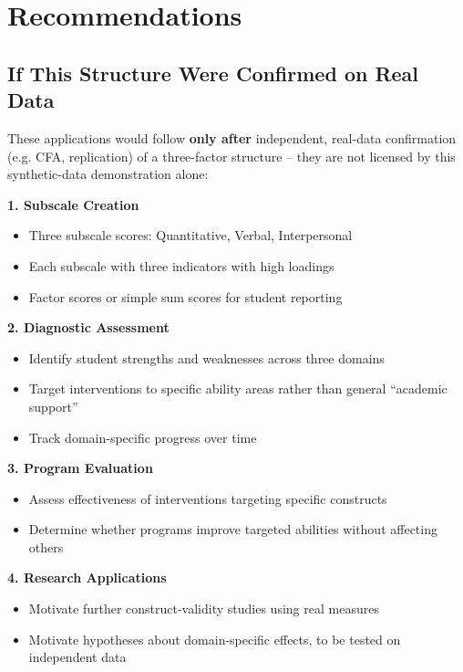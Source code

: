 \documentclass[
]{article}
\begin{document}
\section{Recommendations}

\subsection{If This Structure Were Confirmed on Real Data}

These applications would follow \textbf{only after} independent,
real-data confirmation (e.g. CFA, replication) of a three-factor
structure -- they are not licensed by this synthetic-data demonstration
alone:

\textbf{1. Subscale Creation}

\begin{itemize}
\item
  Three subscale scores: Quantitative, Verbal, Interpersonal
\item
  Each subscale with three indicators with high loadings
\item
  Factor scores or simple sum scores for student reporting
\end{itemize}

\textbf{2. Diagnostic Assessment}

\begin{itemize}
\item
  Identify student strengths and weaknesses across three domains
\item
  Target interventions to specific ability areas rather than general
  ``academic support''
\item
  Track domain-specific progress over time
\end{itemize}

\textbf{3. Program Evaluation}

\begin{itemize}
\item
  Assess effectiveness of interventions targeting specific constructs
\item
  Determine whether programs improve targeted abilities without
  affecting others
\end{itemize}

\textbf{4. Research Applications}

\begin{itemize}
\item
  Motivate further construct-validity studies using real measures
\item
  Motivate hypotheses about domain-specific effects, to be tested on
  independent data
\end{itemize}
\end{document}
